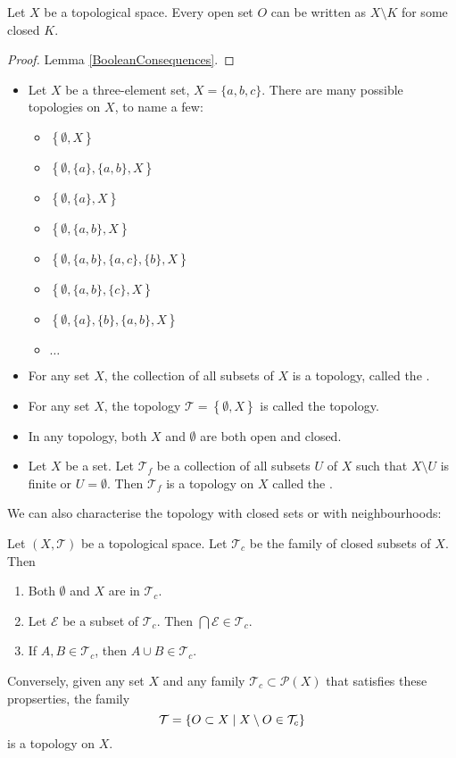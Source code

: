 \begin{lemma}
Let $X$ be a topological space. Every open set $O$ can be written as $X\setminus K$ for some closed $K$.
\end{lemma}
\begin{proof}
Lemma \ref{BooleanConsequences}.
\end{proof}

\begin{example}
\begin{itemize}
\item Let $X$ be a three-element set, $X = \{a,b,c\}$. There are many possible topologies on $X$, to name a few:
\begin{itemize}
\item $\left\{\emptyset, X\right\}$
\item $\left\{\emptyset, \{a\}, \{a,b\}, X\right\}$
\item $\left\{\emptyset, \{a\}, X\right\}$
\item $\left\{\emptyset, \{a,b\}, X\right\}$
\item $\left\{\emptyset, \{a,b\}, \{a,c\}, \{b\}, X\right\}$
\item $\left\{\emptyset, \{a,b\}, \{c\}, X\right\}$
\item $\left\{\emptyset, \{a\}, \{b\}, \{a,b\}, X\right\}$
\item $\ldots$
\end{itemize}
\item For any set $X$, the collection of all subsets of $X$ is a topology, called the .
\item For any set $X$, the topology $\mathcal{T} = \left\{\emptyset, X\right\}$ is called the  topology.
\item In any topology, both $X$ and $\emptyset$ are both open and closed.
\item Let $X$ be a set. Let $\mathcal{T}_f$ be a collection of all subsets $U$ of $X$ such that $X\setminus U$ is finite or $U=\emptyset$. Then $\mathcal{T}_f$ is a topology on $X$ called the .
\end{itemize}
\end{example}

We can also characterise the topology with closed sets or with neighbourhoods:
\begin{proposition}
Let $(X,\mathcal{T})$ be a topological space. Let $\mathcal{T}_c$ be the family of closed subsets of $X$. Then
\begin{enumerate}
\item Both $\emptyset$ and $X$ are in $\mathcal{T}_c$.
\item Let $\mathcal{E}$ be a subset of $\mathcal{T}_c$. Then $\bigcap\mathcal{E}\in\mathcal{T}_c$.
\item If $A,B\in \mathcal{T}_c$, then $A\cup B\in \mathcal{T}_c$.
\end{enumerate}
Conversely, given any set $X$ and any family $\mathcal{T}_c\subset\mathcal{P}(X)$ that satisfies these propserties, the family
\[ \mathcal{T} = \left\{ O\subset X \;\middle|\; X\setminus O\in\mathcal{T}_c \right\} \]
is a topology on $X$. 
\end{proposition}


